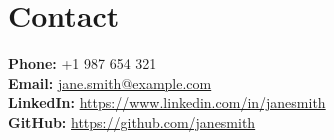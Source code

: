 \documentclass[11pt,a4paper]{article}
\begin{document}
\section{Contact}
\textbf{Phone:} +1 987 654 321\\
\textbf{Email:} \href{mailto:jane.smith@example.com}{jane.smith@example.com}\\
\textbf{LinkedIn:} \href{https://www.linkedin.com/in/janesmith}{https://www.linkedin.com/in/janesmith}\\
\textbf{GitHub:} \href{https://github.com/janesmith}{https://github.com/janesmith}
\end{document}
